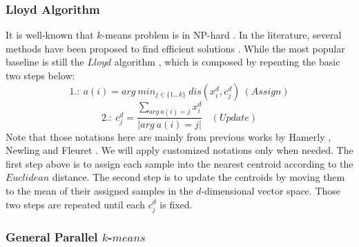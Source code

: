 \subsubsection{Lloyd Algorithm}
It is well-known that $k$-means problem is in NP-hard \cite{newling2016nested}. In the literature, several methods have been proposed to find efficient solutions \cite{newling2016fast,newling2016nested,ding2015yinyang,curtin2017dual,shen2017compressed,bottesch2016speeding}. While the most popular baseline is still the $Lloyd$ algorithm \cite{lloyd1982least}, which is composed by repeating the basic two steps below:
$$1.:\ a(i) = arg\ min_{j\in \{1 \ldots k \} }\ dis({x^d_i}, c^d_j)\ (Assign)$$
$$2.:\ c^d_j = \frac{\sum_{arg\ a(i)=j}x^d_i}{| arg\ a(i)=j |}\ \ \ \ (Update) $$
Note that those notations here are mainly from previous works by Hamerly \cite{hamerly2010making}, Newling and Fleuret \cite{newling2016fast}. We will apply customized notations only when needed. 
The first step above is to assign each sample into the nearest centroid according to the $Euclidean$ distance. The second step is to update the centroids by moving them to the mean of their assigned samples in the $d$-dimensional vector space. Those two steps are repeated until each $c^d_j$ is fixed. %



%


\subsubsection{General Parallel $k$-$means$}

